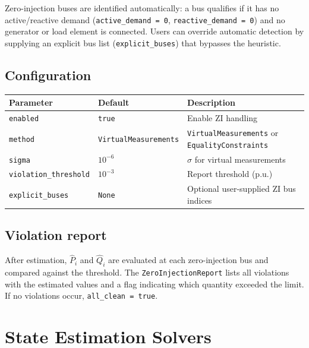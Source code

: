 \documentclass[11pt,a4paper]{article}
\begin{document}
Zero-injection buses are identified automatically: a bus qualifies if it
has no active/reactive demand (\texttt{active\_demand = 0},
\texttt{reactive\_demand = 0}) and no generator or load element is
connected.  Users can override automatic detection by supplying an
explicit bus list (\texttt{explicit\_buses}) that bypasses the heuristic.

\subsection{Configuration}

\begin{center}
\small
\begin{tabular}{llp{52mm}}
  \toprule
  \textbf{Parameter} & \textbf{Default} & \textbf{Description} \\
  \midrule
  \texttt{enabled}               & \texttt{true}  & Enable ZI handling \\
  \texttt{method}                & \texttt{VirtualMeasurements}
    & \texttt{VirtualMeasurements} or \texttt{EqualityConstraints} \\
  \texttt{sigma}                 & $10^{-6}$      & $\sigma$ for virtual measurements \\
  \texttt{violation\_threshold}  & $10^{-3}$      & Report threshold (p.u.) \\
  \texttt{explicit\_buses}       & \texttt{None}  & Optional user-supplied ZI bus indices \\
  \bottomrule
\end{tabular}
\end{center}

\subsection{Violation report}

After estimation, $\hat{P}_i$ and $\hat{Q}_i$ are evaluated at each
zero-injection bus and compared against the threshold.  The
\texttt{ZeroInjectionReport} lists all violations with the estimated
values and a flag indicating which quantity exceeded the limit.  If no
violations occur, \texttt{all\_clean = true}.



\section{State Estimation Solvers}\label{sec:solvers}
\end{document}
